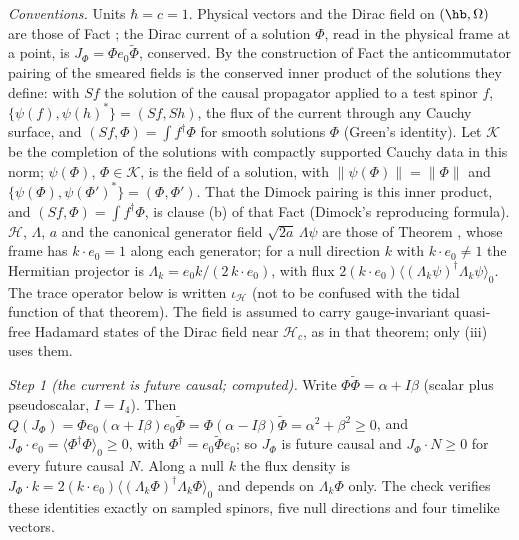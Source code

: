 \emph{Conventions.} Units $\hbar = c = 1$. Physical vectors and the Dirac field on $(\hb, \Omega)$ are those of Fact ; the Dirac current of a solution $\Phi$, read in the physical frame at a point, is $J_{\Phi} = \Phi e_{0}\tilde\Phi$, conserved. By the construction of Fact  the anticommutator pairing of the smeared fields is the conserved inner product of the solutions they define: with $Sf$ the solution of the causal propagator applied to a test spinor $f$, $\{\psi(f), \psi(h)^{*}\} = (Sf, Sh)$, the flux of the current through any Cauchy surface, and $(Sf, \Phi) = \int f^{\dagger}\Phi$ for smooth solutions $\Phi$ (Green's identity). Let $\mathcal{K}$ be the completion of the solutions with compactly supported Cauchy data in this norm; $\psi(\Phi)$, $\Phi \in \mathcal{K}$, is the field of a solution, with $\|\psi(\Phi)\| = \|\Phi\|$ and $\{\psi(\Phi), \psi(\Phi')^{*}\} = (\Phi, \Phi')$. That the Dimock pairing is this inner product, and $(Sf, \Phi) = \int f^{\dagger}\Phi$, is clause (b) of that Fact (Dimock's reproducing formula). $\mathcal{H}$, $\Lambda$, $a$ and the canonical generator field $\sqrt{2a}\,\Lambda\psi$ are those of Theorem , whose frame has $k\cdot e_{0} = 1$ along each generator; for a null direction $k$ with $k\cdot e_{0} \ne 1$ the Hermitian projector is $\Lambda_{k} = e_{0}k/(2\,k\cdot e_{0})$, with flux $2(k\cdot e_{0})\langle(\Lambda_{k}\psi)^{\dagger}\Lambda_{k}\psi\rangle_{0}$. The trace operator below is written $\iota_{\mathcal{H}}$ (not to be confused with the tidal function of that theorem). The field is assumed to carry gauge-invariant quasi-free Hadamard states of the Dirac field near $\mathcal{H}_{c}$, as in that theorem; only (iii) uses them.

\emph{Step 1 (the current is future causal; computed).} Write $\Phi\tilde\Phi = \alpha + I\beta$ (scalar plus pseudoscalar, $I = I_{4}$). Then $Q(J_{\Phi}) = \Phi e_{0}(\alpha + I\beta)e_{0}\tilde\Phi = \Phi(\alpha - I\beta)\tilde\Phi = \alpha^{2} + \beta^{2} \ge 0$, and $J_{\Phi}\cdot e_{0} = \langle\Phi^{\dagger}\Phi\rangle_{0} \ge 0$, with $\Phi^{\dagger} = e_{0}\tilde\Phi e_{0}$; so $J_{\Phi}$ is future causal and $J_{\Phi}\cdot N \ge 0$ for every future causal $N$. Along a null $k$ the flux density is $J_{\Phi}\cdot k = 2(k\cdot e_{0})\langle(\Lambda_{k}\Phi)^{\dagger}\Lambda_{k}\Phi\rangle_{0}$ and depends on $\Lambda_{k}\Phi$ only. The check verifies these identities exactly on sampled spinors, five null directions and four timelike vectors.

